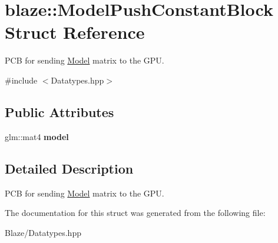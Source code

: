 \hypertarget{structblaze_1_1ModelPushConstantBlock}{}\section{blaze\+:\+:Model\+Push\+Constant\+Block Struct Reference}
\label{structblaze_1_1ModelPushConstantBlock}


P\+CB for sending \hyperlink{classblaze_1_1Model}{Model} matrix to the G\+PU.  




{\ttfamily \#include $<$Datatypes.\+hpp$>$}

\subsection*{Public Attributes}
\begin{DoxyCompactItemize}
\item 
\mbox{\label{structblaze_1_1ModelPushConstantBlock_aea55d029bfaa5f7203c84ec0b181db42}} 
glm\+::mat4 {\bfseries model}
\end{DoxyCompactItemize}


\subsection{Detailed Description}
P\+CB for sending \hyperlink{classblaze_1_1Model}{Model} matrix to the G\+PU. 

The documentation for this struct was generated from the following file\+:\begin{DoxyCompactItemize}
\item 
Blaze/Datatypes.\+hpp\end{DoxyCompactItemize}
